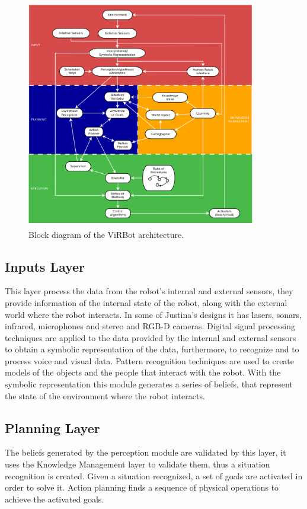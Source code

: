 \documentclass{llncs}
\begin{document}
\begin{figure}[h]
	\centering
	\includegraphics[angle=0, height=10cm, width=10cm]{Figures/ViRBot.eps}
	\caption{Block diagram of the ViRBot architecture.}
	\label{fig:virbot}
\end{figure}


\subsection{Inputs Layer}

This layer process the data from the robot's internal and external sensors, they provide information of the internal state of the robot, along with the external world where the robot interacts.
In some of Justina's designs it has lasers, sonars, infrared, microphones and stereo and RGB-D cameras.
Digital signal processing techniques are applied to the data provided by the internal and external sensors to obtain a symbolic representation of the data, furthermore, to recognize and to process voice and visual data.
Pattern recognition techniques are used to create models of the objects and the people that interact with the robot.
With the symbolic representation this module generates a series of beliefs, that represent the state of the environment where the robot interacts.


\subsection{Planning Layer}

The beliefs generated by the perception module are validated by this layer, it uses the Knowledge Management layer to validate them, thus a situation recognition is created.
Given a situation recognized, a set of goals are activated in order to solve it.
Action planning finds a sequence of physical operations to achieve the activated goals.
\end{document}
